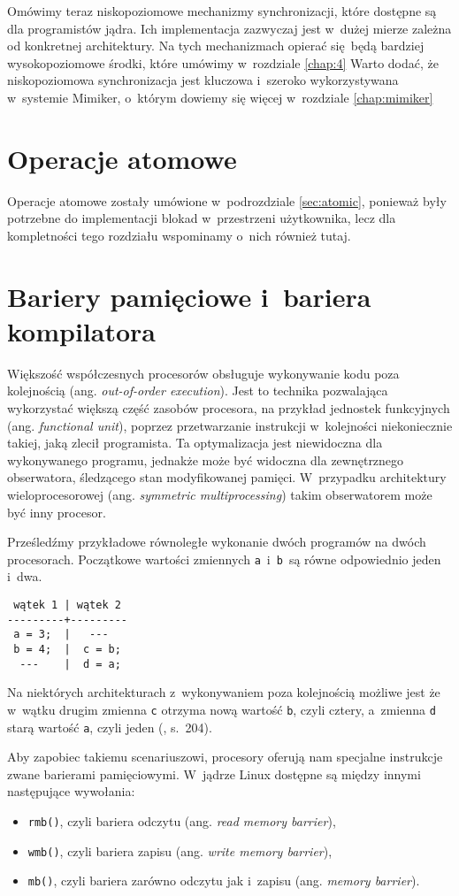 \documentclass[shortabstract]{iithesis}
\theoremstyle{definition} \newtheorem*{definition}{Definicja}
\theoremstyle{definition} \newtheorem*{example}{Przykład}
\theoremstyle{definition} \newtheorem*{remark}{Uwaga}
\begin{document}
Omówimy teraz niskopoziomowe mechanizmy synchronizacji, które dostępne są dla programistów
jądra. Ich implementacja zazwyczaj jest w~dużej mierze zależna od konkretnej architektury.
Na tych mechanizmach opierać się będą bardziej wysokopoziomowe środki, które umówimy
w~rozdziale \ref{chap:4} Warto dodać, że niskopoziomowa synchronizacja jest kluczowa i~szeroko wykorzystywana
w~systemie Mimiker, o~którym dowiemy się więcej w~rozdziale \ref{chap:mimiker}

\section{Operacje atomowe}
Operacje atomowe zostały umówione w~podrozdziale \ref{sec:atomic}, ponieważ były potrzebne do implementacji
blokad w~przestrzeni użytkownika, lecz dla kompletności tego rozdziału wspominamy o~nich również tutaj.

\section{Bariery pamięciowe i~bariera kompilatora}

Większość współczesnych procesorów obsługuje wykonywanie kodu poza kolejnością (ang. \textit{out-of-order execution}).
Jest to technika pozwalająca wykorzystać większą część zasobów procesora, na przykład jednostek funkcyjnych
(ang. \textit{functional unit}), poprzez przetwarzanie instrukcji w~kolejności niekoniecznie takiej, jaką zlecił
programista. Ta optymalizacja jest niewidoczna dla wykonywanego programu, jednakże może być
widoczna dla zewnętrznego obserwatora, śledzącego stan modyfikowanej pamięci. W~przypadku architektury
wieloprocesorowej (ang. \textit{symmetric multiprocessing}) takim obserwatorem może być inny procesor.

Prześledźmy przykładowe równoległe wykonanie dwóch programów na dwóch procesorach. Początkowe wartości
zmiennych \texttt{a}~i~\texttt{b}~są równe odpowiednio jeden i~dwa.
\begin{lstlisting}
 wątek 1 | wątek 2
---------+---------
 a = 3;  |   ---
 b = 4;  |  c = b;
  ---    |  d = a;
\end{lstlisting}

Na niektórych architekturach z~wykonywaniem poza kolejnością możliwe jest że w~wątku drugim zmienna
\texttt{c} otrzyma nową wartość \texttt{b}, czyli cztery, a~zmienna \texttt{d} starą wartość
\texttt{a}, czyli jeden (\cite{bib:lkd}, s.~204).

Aby zapobiec takiemu scenariuszowi, procesory oferują nam specjalne instrukcje zwane barierami pamięciowymi.
W~jądrze Linux dostępne są między innymi następujące wywołania:
\begin{itemize}
\item \texttt{rmb()}, czyli bariera odczytu (ang. \textit{read memory barrier}),
\item \texttt{wmb()}, czyli bariera zapisu (ang. \textit{write memory barrier}),
\item \texttt{mb()}, czyli bariera zarówno odczytu jak i~zapisu (ang. \textit{memory barrier}).
\end{itemize}
\end{document}
